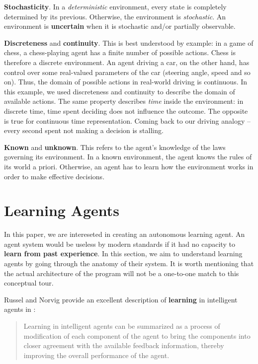 \textbf{Stochasticity}.
In a \emph{deterministic} environment, every state is completely determined by its previous. Otherwise, the environment is \emph{stochastic}. An environment is \textbf{uncertain} when it is stochastic and/or partially observable.

\textbf{Discreteness} and \textbf{continuity}.
This is best understood by example:
in a game of chess, a chess-playing agent has a finite number of possible actions.
Chess is therefore a discrete environment.
An agent driving a car, on the other hand, has control over some real-valued parameters of the car (steering angle, speed and so on).
Thus, the domain of possible actions in real-world driving is continuous.
In this example, we used discreteness and continuity to describe the domain of available actions.
The same property describes \emph{time} inside the environment: in discrete time, time spent deciding does not influence the outcome. The opposite is true for continuous time representation. Coming back to our driving analogy -- every second spent not making a decision is stalling.

\textbf{Known} and \textbf{unknown}.
This refers to the agent's knowledge of the laws governing its environment. In a known environment, the agent knows the rules of its world a priori. Otherwise, an agent has to learn how the environment works in order to make effective decisions.


\section{Learning Agents} \label{learning-agents}
In this paper, we are intereseted in creating an autonomous learning agent.
An agent system would be useless by modern standards if it had no capacity to \textbf{learn from past experience}.
In this section, we aim to understand learning agents by going through the anatomy of their system.
It is worth mentioning that the actual architecture of the program will not be a one-to-one match to this conceptual tour.

Russel and Norvig provide an excellent description of \textbf{learning} in intelligent agents in \cite{aima}:
\begin{quote}
    Learning in intelligent agents can be summarized as a process of modification of each component of the agent to bring the components into closer agreement with the available feedback information, thereby improving the overall performance of the agent.
\end{quote}

